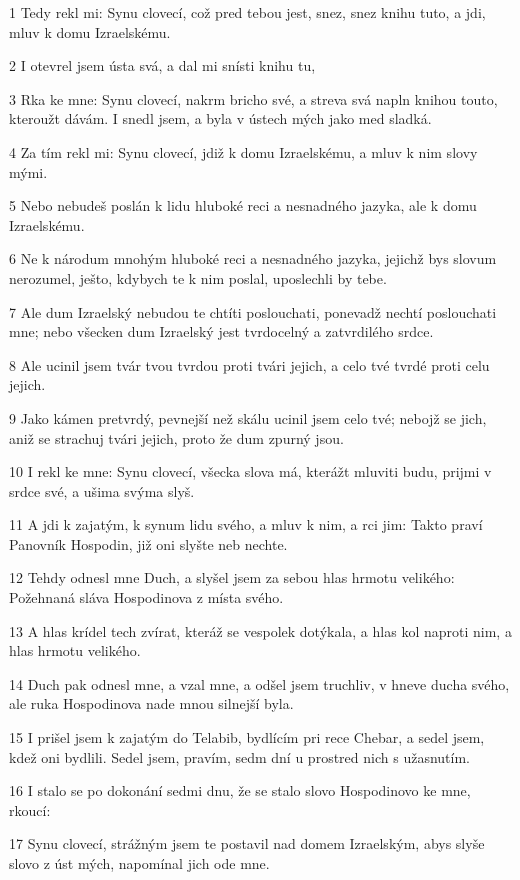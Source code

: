\par 1 Tedy rekl mi: Synu clovecí, což pred tebou jest, snez, snez knihu tuto, a jdi, mluv k domu Izraelskému.
\par 2 I otevrel jsem ústa svá, a dal mi snísti knihu tu,
\par 3 Rka ke mne: Synu clovecí, nakrm bricho své, a streva svá napln knihou touto, kteroužt dávám. I snedl jsem, a byla v ústech mých jako med sladká.
\par 4 Za tím rekl mi: Synu clovecí, jdiž k domu Izraelskému, a mluv k nim slovy mými.
\par 5 Nebo nebudeš poslán k lidu hluboké reci a nesnadného jazyka, ale k domu Izraelskému.
\par 6 Ne k národum mnohým hluboké reci a nesnadného jazyka, jejichž bys slovum nerozumel, ješto, kdybych te k nim poslal, uposlechli by tebe.
\par 7 Ale dum Izraelský nebudou te chtíti poslouchati, ponevadž nechtí poslouchati mne; nebo všecken dum Izraelský jest tvrdocelný a zatvrdilého srdce.
\par 8 Ale ucinil jsem tvár tvou tvrdou proti tvári jejich, a celo tvé tvrdé proti celu jejich.
\par 9 Jako kámen pretvrdý, pevnejší než skálu ucinil jsem celo tvé; nebojž se jich, aniž se strachuj tvári jejich, proto že dum zpurný jsou.
\par 10 I rekl ke mne: Synu clovecí, všecka slova má, kterážt mluviti budu, prijmi v srdce své, a ušima svýma slyš.
\par 11 A jdi k zajatým, k synum lidu svého, a mluv k nim, a rci jim: Takto praví Panovník Hospodin, již oni slyšte neb nechte.
\par 12 Tehdy odnesl mne Duch, a slyšel jsem za sebou hlas hrmotu velikého: Požehnaná sláva Hospodinova z místa svého.
\par 13 A hlas krídel tech zvírat, kteráž se vespolek dotýkala, a hlas kol naproti nim, a hlas hrmotu velikého.
\par 14 Duch pak odnesl mne, a vzal mne, a odšel jsem truchliv, v hneve ducha svého, ale ruka Hospodinova nade mnou silnejší byla.
\par 15 I prišel jsem k zajatým do Telabib, bydlícím pri rece Chebar, a sedel jsem, kdež oni bydlili. Sedel jsem, pravím, sedm dní u prostred nich s užasnutím.
\par 16 I stalo se po dokonání sedmi dnu, že se stalo slovo Hospodinovo ke mne, rkoucí:
\par 17 Synu clovecí, strážným jsem te postavil nad domem Izraelským, abys slyše slovo z úst mých, napomínal jich ode mne.
